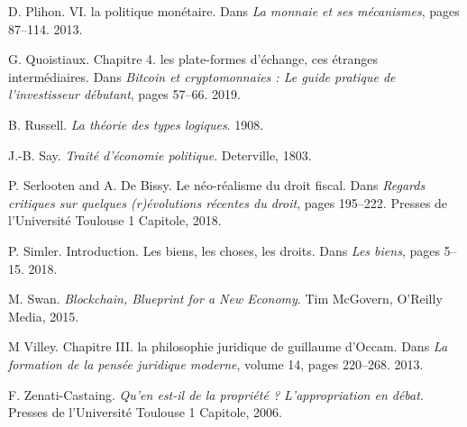 {D. Plihon. VI. la politique monétaire. Dans \emph{La monnaie et ses mécanismes}, pages 87–114. 2013.\par
G. Quoistiaux. Chapitre 4. les plate-formes d'échange, ces étranges intermédiaires. Dans \emph{Bitcoin et cryptomonnaies : Le guide pratique de l'investisseur débutant}, pages 57–66. 2019.\par
B. Russell. \emph{La théorie des types logiques}. 1908.\par
J.-B. Say. \emph{Traité d'économie politique}. Deterville, 1803.\par
P. Serlooten and A. De Bissy. Le néo-réalisme du droit fiscal. Dans \emph{Regards critiques sur quelques (r)évolutions récentes du droit}, pages 195–222. Presses de l'Université Toulouse 1 Capitole, 2018.\par
P. Simler. Introduction. Les biens, les choses, les droits. Dans \emph{Les biens}, pages 5–15. 2018.\par
M. Swan. \emph{Blockchain, Blueprint for a New Economy}. Tim McGovern, O'Reilly Media, 2015.\par
M Villey. Chapitre III. la philosophie juridique de guillaume d'Occam. Dans \emph{La formation de la pensée juridique moderne}, volume 14, pages 220–268. 2013.\par
F. Zenati-Castaing. \emph{Qu'en est-il de la propriété ? L'appropriation en débat}. Presses de l'Université Toulouse 1 Capitole, 2006.\par

}
